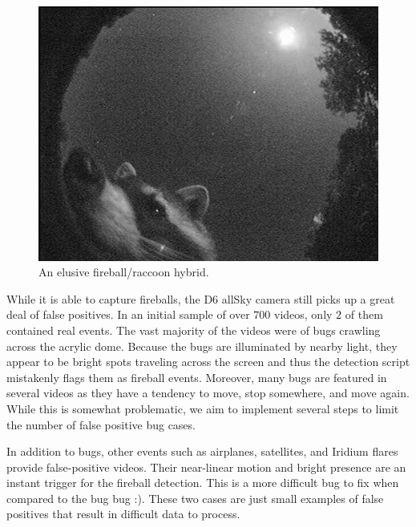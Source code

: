 \begin{figure}[ht!]
  \centering
  \includegraphics[scale=0.3]{images/racoon_cam.jpg}
  \caption{An elusive fireball/raccoon hybrid.}
  \label{raccoon}
\end{figure}

While it is able to capture fireballs, the D6 allSky camera still picks up a great deal of false positives.
In an initial sample of over $700$ videos, only $2$ of them contained real events.
The vast majority of the videos were of bugs crawling across the acrylic dome.
Because the bugs are illuminated by nearby light, they appear to be bright spots traveling across the screen and thus the detection script mistakenly flags them as fireball events.
Moreover, many bugs are featured in several videos as they have a tendency to move, stop somewhere, and move again.
While this is somewhat problematic, we aim to implement several steps to limit the number of false positive bug cases.

In addition to bugs, other events such as airplanes, satellites, and Iridium flares provide false-positive videos.
Their near-linear motion and bright presence are an instant trigger for the fireball detection.
This is a more difficult bug to fix when compared to the bug bug :).
These two cases are just small examples of false positives that result in difficult data to process.

